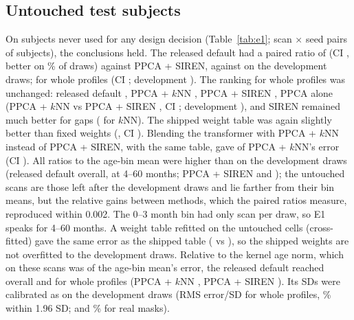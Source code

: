 \documentclass[11pt]{article}
\begin{document}
\subsection{Untouched test subjects}\label{sec:e1}

\begin{table}[t]
\centering\footnotesize
\caption{E1: untouched subjects (seeds 3--5; subjects of seeds 0--2 excluded; \eOneScansBinA, \eOneScansBinB{} and
\eOneScansBinC{} scans per draw in the three bins), the shipped weight table scored as released. ``Real mask'': the
fourth pass.}\label{tab:e1}
\resizebox{\textwidth}{!}{}
\end{table}

On subjects never used for any design decision (Table~\ref{tab:e1}; \eOnePairs{} scan $\times$ seed pairs of
\eOneSubjects{} subjects), the conclusions held. The released default had a paired ratio of \eOneFinalVsDef{} (CI
\eOneFinalVsDefCi, better on \eOneFinalVsDefBetter\% of draws) against PPCA + SIREN, against \cORatio{} on the
development draws; for whole profiles \eOneFinalVsDefWhole{} (CI \eOneFinalVsDefWholeCi; development \pcEWhole). The
ranking for whole profiles was unchanged: released default \eOneFinalWhole, PPCA + $k$NN \eOneKnnWhole, PPCA + SIREN
\eOneDefWhole, PPCA alone \eOnePpcaWhole{} (PPCA + $k$NN vs PPCA + SIREN \eOneKnnVsDefWhole, CI \eOneKnnVsDefWholeCi;
development \pcAWhole), and SIREN remained much better for gaps (\eOneKnnVsDefGap{} for $k$NN). The shipped weight table
was again slightly better than fixed weights (\eOneFinalVsFixed, CI \eOneFinalVsFixedCi). Blending the transformer with
PPCA + $k$NN instead of PPCA + SIREN, with the same table, gave \eOneFinalKnnVsKnn{} of PPCA + $k$NN's error (CI
\eOneFinalKnnVsKnnCi). All ratios to the age-bin mean were higher than on the development draws (released default
\eOneFinal{} overall, \eOneFinalOverallBC{} at 4--60 months; PPCA + SIREN \eOneDef{} and \eOneDefOverallBC); the
untouched scans are those left after the development draws and lie farther from their bin means, but the relative gains
between methods, which the paired ratios measure, reproduced within 0.002. The 0--3 month bin had only
\eOneScansBinA{} scan per draw, so E1 speaks for 4--60 months. A weight table refitted on the untouched cells (cross-fitted) gave the same error as
the shipped table (\eOneRefitDump{} vs \eOneShippedDump), so the shipped weights are not overfitted to the development
draws. Relative to the kernel age norm, which on these scans was \eOneKernelAlone{} of the age-bin mean's error, the released
default reached \eOneKFinal{} overall and \eOneKFinalWhole{} for whole profiles (PPCA + $k$NN \eOneKKnnWhole, PPCA + SIREN
\eOneKDefWhole). Its SDs were calibrated as on the development draws (RMS error/SD \eOneCalWhole{} for whole profiles,
\eOneCalWholeCov\% within 1.96 SD; \eOneCalReal{} and \eOneCalRealCov\% for real masks).
\end{document}
